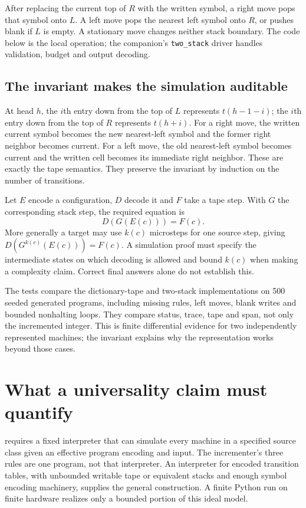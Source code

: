 After replacing the current top of $R$ with the written symbol, a right move
pops that symbol onto $L$. A left move pops the nearest left symbol onto
$R$, or pushes blank if $L$ is empty. A stationary move changes neither
stack boundary. The code below is the local operation; the companion's
\texttt{two\_stack} driver handles validation, budget and output decoding.


\subsection{The invariant makes the simulation auditable}
At head $h$, the $i$th entry down from the top of $L$ represents
$t(h-1-i)$; the $i$th entry down from the top of $R$ represents $t(h+i)$.
For a right move, the written current symbol becomes the new nearest-left
symbol and the former right neighbor becomes current. For a left move,
the old nearest-left symbol becomes current and the written cell becomes
its immediate right neighbor. These are exactly the tape semantics.
They preserve the invariant by induction on the number of transitions.

Let $E$ encode a configuration, $D$ decode it and $F$ take a tape step.
With $G$ the corresponding stack step, the required equation is
\begin{equation}
 D(G(E(c)))=F(c).
\end{equation}
More generally a target may use $k(c)$ microsteps for one source step,
giving $D(G^{k(c)}(E(c)))=F(c)$. A simulation proof must specify the
intermediate states on which decoding is allowed and bound $k(c)$ when
making a complexity claim. Correct final answers alone do not establish this.

The tests compare the dictionary-tape and two-stack implementations on 500
seeded generated programs, including missing rules, left moves, blank writes
and bounded nonhalting loops. They compare status, trace, tape and span,
not only the incremented integer. This is finite differential evidence for
two independently represented machines; the invariant explains why the
representation works beyond those cases.

\section{What a universality claim must quantify}
 requires a fixed interpreter that can simulate every
machine in a specified source class given an effective program encoding and
input. The incrementer's three rules are one program, not that interpreter.
An interpreter for encoded transition tables, with unbounded writable tape
or equivalent stacks and enough symbol encoding machinery, supplies the
general construction. A finite Python run on finite hardware realizes only
a bounded portion of this ideal model.

